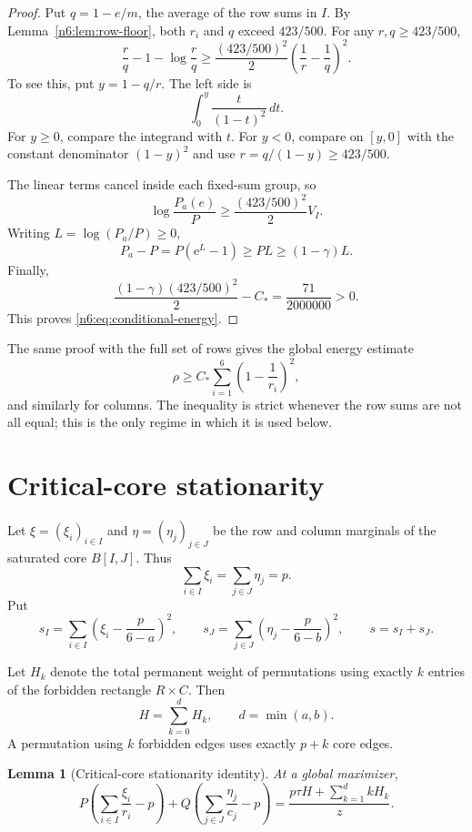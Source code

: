 \documentclass[11pt]{article}
\numberwithin{equation}{section}
\newtheorem{lemma}[theorem]{Lemma}
\theoremstyle{definition}
\newcommand{\e}{\mathrm e}
\begin{document}
\begin{proof}
Put $q=1-e/m$, the average of the row sums in $I$.  By
Lemma~\ref{n6:lem:row-floor}, both $r_i$ and $q$ exceed $423/500$.  For any
$r,q\ge423/500$,
\begin{equation}
 \frac rq-1-\log\frac rq
 \ge
 \frac{(423/500)^2}{2}
 \left(\frac1r-\frac1q\right)^2.\label{n6:eq:scalar-energy}
\end{equation}
To see this, put $y=1-q/r$.  The left side is
\[
 \int_0^y\frac{t}{(1-t)^2}\,dt.
\]
For $y\ge0$, compare the integrand with $t$.  For $y<0$, compare on
$[y,0]$ with the constant denominator $(1-y)^2$ and use
$r=q/(1-y)\ge423/500$.

The linear terms cancel inside each fixed-sum group, so
\[
 \log\frac{P_a(e)}P
 \ge\frac{(423/500)^2}{2}V_I.
\]
Writing $L=\log(P_a/P)\ge0$,
\[
 P_a-P=P(\e^L-1)\ge P L\ge(1-\gamma)L.
\]
Finally,
\[
 \frac{(1-\gamma)(423/500)^2}{2}-C_*
 =\frac{71}{2000000}>0.
\]
This proves \eqref{n6:eq:conditional-energy}.
\end{proof}

The same proof with the full set of rows gives the global energy estimate
\begin{equation}
 \rho\ge C_*\sum_{i=1}^6\left(1-\frac1{r_i}\right)^2,\label{n6:eq:global-energy}
\end{equation}
and similarly for columns.  The inequality is strict whenever the row sums
are not all equal; this is the only regime in which it is used below.

\section{Critical-core stationarity}\label{n6:sec:stationarity}

Let $\xi=(\xi_i)_{i\in I}$ and $\eta=(\eta_j)_{j\in J}$ be the row and column
marginals of the saturated core $B[I,J]$.  Thus
\[
 \sum_{i\in I}\xi_i=\sum_{j\in J}\eta_j=p.
\]
Put
\begin{equation}
 s_I=\sum_{i\in I}\left(\xi_i-\frac p{6-a}\right)^2,
 \qquad
 s_J=\sum_{j\in J}\left(\eta_j-\frac p{6-b}\right)^2,
 \qquad s=s_I+s_J.\label{n6:eq:core-s}
\end{equation}

Let $H_k$ denote the total permanent weight of permutations using exactly
$k$ entries of the forbidden rectangle $R\times C$.  Then
\[
 H=\sum_{k=0}^{d}H_k,
 \qquad d=\min(a,b).
\]
A permutation using $k$ forbidden edges uses exactly $p+k$ core edges.

\begin{lemma}[Critical-core stationarity identity]\label{n6:lem:core-stationarity}
At a global maximizer,
\begin{equation}
 P\left(\sum_{i\in I}\frac{\xi_i}{r_i}-p\right)
 +Q\left(\sum_{j\in J}\frac{\eta_j}{c_j}-p\right)
 =\frac{p\tau H+\sum_{k=1}^{d}kH_k}{z}.\label{n6:eq:core-stationarity}
\end{equation}
\end{lemma}
\end{document}

